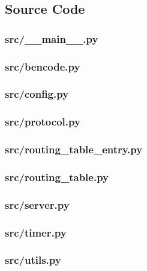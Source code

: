 \documentclass[11pt]{article} %
\begin{document}
\subsection{Source Code}

\subsubsection{src/\_\_main\_\_.py}


\subsubsection{src/bencode.py}


\subsubsection{src/config.py}


\subsubsection{src/protocol.py}


\subsubsection{src/routing\_table\_entry.py}


\subsubsection{src/routing\_table.py}


\subsubsection{src/server.py}


\subsubsection{src/timer.py}


\subsubsection{src/utils.py}

\end{document}
